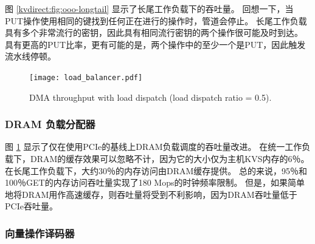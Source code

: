 图 \ref {kvdirect:fig:ooo-longtail} 显示了长尾工作负载下的吞吐量。
回想一下，当PUT操作使用相同的键找到任何正在进行的操作时，管道会停止。
长尾工作负载具有多个非常流行的密钥，因此具有相同流行密钥的两个操作很可能及时到达。
具有更高的PUT比率，更有可能的是，两个操作中的至少一个是PUT，因此触发流水线停顿。


\begin{figure}[t]
\centering
{\texttt{[image: load\_balancer.pdf]}}
\caption{DMA throughput with load dispatch (load dispatch ratio = 0.5).}
\label{kvdirect:fig:cache-tput}

\end{figure}

\subsubsection{DRAM 负载分配器}
\label{kvdirect:sec:dram-eval}

图 \ref {kvdirect:fig:cache-tput} 显示了仅在使用PCIe的基线上DRAM负载调度的吞吐量改进。
在统一工作负载下，DRAM的缓存效果可以忽略不计，因为它的大小仅为主机KVS内存的6％。
在长尾工作负载下，大约30％的内存访问由DRAM缓存提供。 总的来说，95％和100％GET的内存访问吞吐量实现了180 Mops的时钟频率限制。
但是，如果简单地将DRAM用作高速缓存，则吞吐量将受到不利影响，因为DRAM吞吐量低于PCIe吞吐量。

\subsubsection{向量操作译码器}
\label{kvdirect:network-eval}

\begin{table}[]
\centering
{}
\caption{Throughput (GB/s) of vector operations with vector update or alternatives.}
\label{kvdirect:tab:vec_throughput}

\end{table}

